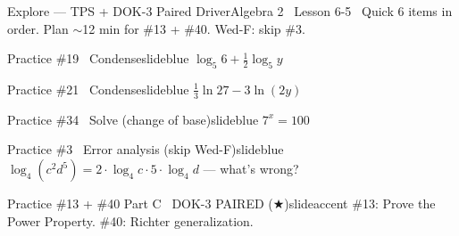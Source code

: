 \documentclass[aspectratio=169, 11pt]{beamer}
\begin{document}
\begin{frame}{Explore --- TPS + DOK-3 Paired Driver}{Algebra 2 \textperiodcentered\ Lesson 6-5 \textperiodcentered\ Quick}
\small\textcolor{slidegray}{6 items in order. Plan \(\sim\)12 min for \#13 + \#40. Wed-F: skip \#3.}

\vspace{0.1cm}
\begin{projcard}{Practice \#19 \textperiodcentered\ Condense}{slideblue}
\(\log_5 6 + \tfrac{1}{2}\log_5 y\)
\end{projcard}
\vspace{-0.12cm}
\begin{projcard}{Practice \#21 \textperiodcentered\ Condense}{slideblue}
\(\tfrac{1}{3}\ln 27 - 3\ln(2y)\)
\end{projcard}
\vspace{-0.12cm}
\begin{projcard}{Practice \#34 \textperiodcentered\ Solve (change of base)}{slideblue}
\(7^x = 100\)
\end{projcard}
\vspace{-0.12cm}
\begin{projcard}{Practice \#3 \textperiodcentered\ Error analysis (skip Wed-F)}{slideblue}
\(\log_4(c^2 d^5) = 2\cdot\log_4 c \cdot 5\cdot\log_4 d\) --- what's wrong?
\end{projcard}
\vspace{-0.12cm}
\begin{projcard}{Practice \#13 + \#40 Part C \textperiodcentered\ DOK-3 PAIRED (\(\bigstar\))}{slideaccent}
\#13: Prove the Power Property. \quad \#40: Richter generalization.
\end{projcard}
\end{frame}
\end{document}
